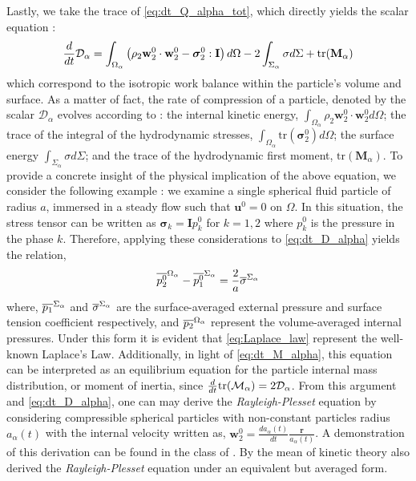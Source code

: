 Lastly, we take the trace of \ref{eq:dt_Q_alpha_tot}, which directly yields the scalar equation :
\begin{equation}
    \frac{d}{d t} \mathcal{D}_\alpha
    = \int_{\Omega_\alpha} \left(
        \rho_2 \textbf{w}_2^0 \cdot \textbf{w}_2^0
        - \bm{\sigma}_2^0 : \textbf{I}
        \right) d\Omega
        - 2\int_{\Sigma_\alpha} \sigma d\Sigma
        + \text{tr}(\textbf{M}_\alpha)
    \label{eq:dt_D_alpha}
\end{equation}
which correspond to the isotropic work balance within the particle's volume and surface. 
As a matter of fact, the rate of compression of a particle, denoted by the scalar $\mathcal{D}_\alpha$ evolves according to : 
the internal kinetic energy, $\int_{\Omega_\alpha}\rho_2 \textbf{w}_2^0 \cdot \textbf{w}_2^0 d\Omega$;
the trace of the integral of the hydrodynamic stresses, $\int_{\Omega_\alpha} \text{tr}(\bm{\sigma}_2^0)d\Omega$; 
the surface energy $\int_{\Sigma_\alpha} \sigma d\Sigma$; 
and the trace of the hydrodynamic first moment, $\text{tr}(\textbf{M}_\alpha)$.
To provide a concrete insight of the physical implication of the above equation, we consider the following example :
we examine a single spherical fluid particle of radius $a$, immersed in a steady flow such that $\textbf{u}^0 = 0$ on $\Omega$. 
In this situation, the stress tensor can be written as $\bm{\sigma}_k = \textbf{I} p_k^0$ for $k = 1, 2$ where $p_k^0$ is the pressure in the phase $k$. 
Therefore, applying these considerations to \ref{eq:dt_D_alpha} yields the relation, 
\begin{equation*}
    \overline{p_2^0}^{\Omega_\alpha} 
    - \overline{p_1^0}^{\Sigma_\alpha}
    =
    \frac{2}{a} \overline{\sigma}^{\Sigma_\alpha}
    \label{eq:Laplace_law}
\end{equation*}
where,  $\overline{p_1}^{\Sigma_\alpha}$ and  $\overline{\sigma}^{\Sigma_\alpha}$ are the surface-averaged external pressure and surface tension coefficient respectively, and $\overline{p_2}^{\Omega_\alpha}$ represent the volume-averaged internal pressures.
Under this form it is evident that \ref{eq:Laplace_law} represent the well-known Laplace's Law. 
Additionally, in light of \ref{eq:dt_M_alpha}, this equation can be interpreted as an equilibrium equation for the particle internal mass distribution, or moment of inertia, since $\frac{d}{d t}\text{tr}(\mathcal{M}_\alpha) = 2 \mathcal{D}_\alpha$. 
From this argument and \ref{eq:dt_D_alpha}, one can may derive the \textit{Rayleigh-Plesset} equation by considering compressible spherical particles with non-constant particles radius $a_\alpha(t)$ with the internal velocity written as, $\textbf{w}^0_2 = \frac{d a_\alpha(t)}{dt}  \frac{\textbf{r}}{a_\alpha(t)}$. 
A demonstration of this derivation can be found in the class of . 
By the mean of kinetic theory \citet{zhang1994averaged} also derived the \textit{Rayleigh-Plesset} equation under an equivalent but averaged form.



